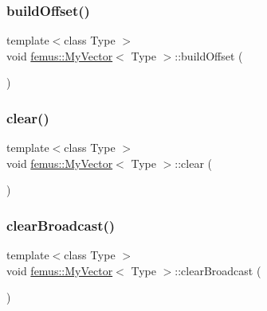 \mbox{\label{classfemus_1_1_my_vector_a07f061a157ea4a23c4aa936db82c34ec}} 
\subsubsection{\texorpdfstring{build\+Offset()}{buildOffset()}}
{\footnotesize\ttfamily template$<$class Type $>$ \\
void \mbox{\hyperlink{classfemus_1_1_my_vector}{femus\+::\+My\+Vector}}$<$ Type $>$\+::build\+Offset (\begin{DoxyParamCaption}{ }\end{DoxyParamCaption})}

\mbox{\label{classfemus_1_1_my_vector_ac789552a08caad37949488d5b203a9e4}} 
\subsubsection{\texorpdfstring{clear()}{clear()}}
{\footnotesize\ttfamily template$<$class Type $>$ \\
void \mbox{\hyperlink{classfemus_1_1_my_vector}{femus\+::\+My\+Vector}}$<$ Type $>$\+::clear (\begin{DoxyParamCaption}{ }\end{DoxyParamCaption})}

\mbox{\label{classfemus_1_1_my_vector_ae674c21dc732db64806c26110367d926}} 
\subsubsection{\texorpdfstring{clear\+Broadcast()}{clearBroadcast()}}
{\footnotesize\ttfamily template$<$class Type $>$ \\
void \mbox{\hyperlink{classfemus_1_1_my_vector}{femus\+::\+My\+Vector}}$<$ Type $>$\+::clear\+Broadcast (\begin{DoxyParamCaption}{ }\end{DoxyParamCaption})}


